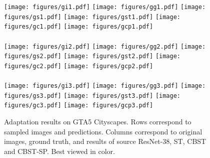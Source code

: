 \documentclass[runningheads]{llncs}
\begin{document}
\begin{figure}[!t]
\centering
{}
\vspace{0.2mm}

\texttt{[image: figures/gi1.pdf]}
\texttt{[image: figures/gg1.pdf]}
\texttt{[image: figures/gs1.pdf]}
\texttt{[image: figures/gst1.pdf]}
\texttt{[image: figures/gc1.pdf]}
\texttt{[image: figures/gcp1.pdf]}\\
\quad\\\vspace{-0.325cm}
\texttt{[image: figures/gi2.pdf]}
\texttt{[image: figures/gg2.pdf]}
\texttt{[image: figures/gs2.pdf]}
\texttt{[image: figures/gst2.pdf]}
\texttt{[image: figures/gc2.pdf]}
\texttt{[image: figures/gcp2.pdf]}\\
\quad\\\vspace{-0.325cm}
\texttt{[image: figures/gi3.pdf]}
\texttt{[image: figures/gg3.pdf]}
\texttt{[image: figures/gs3.pdf]}
\texttt{[image: figures/gst3.pdf]}
\texttt{[image: figures/gc3.pdf]}
\texttt{[image: figures/gcp3.pdf]}
\caption{Adaptation results on GTA5  Cityscapes. Rows correspond to sampled images and predictions. Columns correspond to original images, ground truth, and results of source ResNet-38, ST, CBST and CBST-SP. Best viewed in color.}\label{gta2city}
\end{figure}
\end{document}

